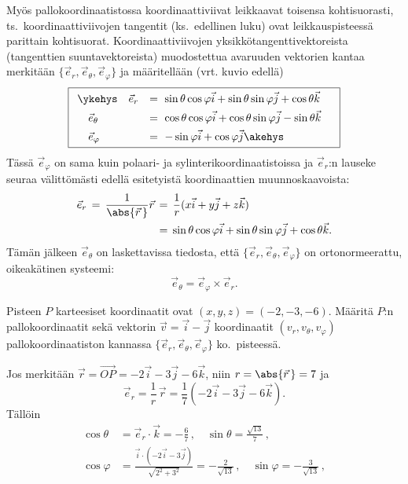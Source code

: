 Myös pallokoordinaatistossa koordinaattiviivat leikkaavat toisensa kohtisuorasti, ts.\
koordinaattiviivojen tangentit (ks.\ edellinen luku) ovat leikkauspisteessä parittain
kohtisuorat. Koordinaattiviivojen yksikkötangenttivektoreista (tangenttien suuntavektoreista)
muodostettua avaruuden vektorien kantaa merkitään $\{\vec e_r, \vec e_\theta, \vec e_\varphi\}$
ja määritellään (vrt. kuvio edellä)
\[
\boxed{
\begin{array}{ll}
\ykehys\quad \vec e_r &= \ \sin{\theta} \cos{\varphi} \vec i + \sin{\theta}\sin{\varphi} \vec j 
                                                             + \cos{\theta} \vec k \quad \\[4pt]
\quad   \vec e_\theta &= \ \cos{\theta} \cos{\varphi} \vec i + \cos{\theta}\sin{\varphi} \vec j 
                                                             - \sin{\theta} \vec k \\[4pt]
\quad  \vec e_\varphi &= \ -\sin{\varphi} \vec i + \cos{\varphi} \vec j \akehys
\end{array}
}
\]
Tässä $\vec e_\varphi$ on sama kuin polaari- ja sylinterikoordinaatistoissa ja $\vec e_r$:n 
lauseke seuraa välittömästi edellä esitetyistä koordinaattien muunnoskaavoista:
\begin{align*}
\vec e_r\,=\,\frac{1}{\abs{\vec r\,}}\vec r\,
               &=\,\frac{1}{r}(x\vec i+y\vec j+z\vec k) \\
               &=\,\sin{\theta} \cos{\varphi} \vec i + \sin{\theta}\sin{\varphi} \vec j 
                                                                  + \cos{\theta} \vec k.
\end{align*}
Tämän jälkeen $\vec e_\theta$ on laskettavissa tiedosta, että 
$\{\vec e_r,\vec e_\theta,\vec e_\varphi\}$ on ortonormeerattu, oikeakätinen systeemi: 
\[
\vec e_\theta=\vec e_\varphi\times\vec e_r.
\]
\begin{Exa} Pisteen $P$ karteesiset koordinaatit ovat $(x,y,z)=(-2,-3,-6)$. Määritä $P$:n
pallokoordinaatit sekä vektorin $\vec v=\vec i-\vec j$ koordinaatit $(v_r,v_\theta,v_\varphi)$
pallokoordinaatiston kannassa $\{\vec e_r,\vec e_\theta,\vec e_\varphi\}$ ko.\ pisteessä.
\end{Exa}
\ratk Jos merkitään $\vec r=\overrightarrow{OP}=-2\vec i-3\vec j-6\vec k$, niin
$r=\abs{\vec r\,}=7$ ja
\[
\vec e_r = \frac{1}{r}\,\vec r =\frac{1}{7}(-2\vec i-3 \vec j-6\vec k).
\]
Tällöin
\begin{align*}
\cos\theta\,&= \vec e_r\cdot\vec k = -\frac{6}{7}\,, \quad \sin\theta=\frac{\sqrt{13}}{7}\,, \\
\cos\varphi &= \frac{\vec i\cdot(-2\vec i-3\vec j)}{\sqrt{2^2+3^2}}=-\frac{2}{\sqrt{13}}\,,
                                                 \quad \sin\varphi =-\frac{3}{\sqrt{13}}\,,
\end{align*}
